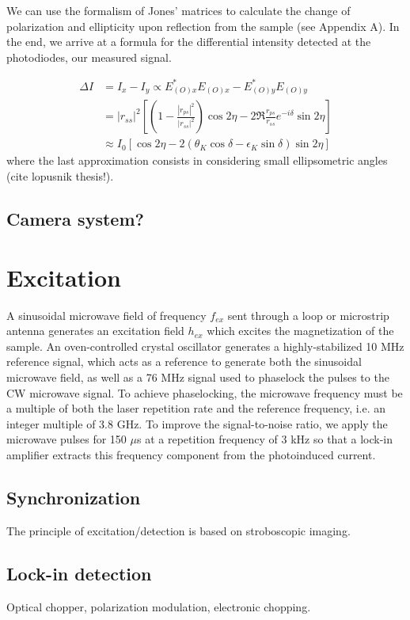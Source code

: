 \documentclass{article}
\begin{document}
We can use the formalism of Jones' matrices to calculate the change of polarization and ellipticity upon reflection from the sample (see Appendix A). In the end, we arrive at a formula for the differential intensity detected at the photodiodes, our measured signal.

\begin{align}
\Delta I &= I_{x} - I_{y} \propto E_{(O)x}^* E_{(O)x} - E_{(O)y}^* E_{(O)y} \\
&= |r_{ss}|^2 \left[ \left(1 - \frac{|r_{ps}|^2}{|r_{ss}|^2}\right) \cos{2 \eta} - 2 \Re{\frac{r_{ps}}{r_{ss}}} e^{-i \delta} \sin{2 \eta} \right] \\
&\approx I_{0} [\cos{2 \eta} - 2(\theta_{K} \cos{\delta} - \epsilon_{K} \sin{\delta}) \sin{2 \eta}]
\end{align}
where the last approximation consists in considering small ellipsometric angles (cite lopusnik thesis!).

\subsection{Camera system?}

\section{Excitation}
A sinusoidal microwave field of frequency $f_{ex}$ sent through a loop or microstrip antenna generates an excitation field $h_{ex}$ which excites the magnetization of the sample. An oven-controlled crystal oscillator generates a highly-stabilized 10 MHz reference signal, which acts as a reference to generate both the sinusoidal microwave field, as well as a 76 MHz signal used to phaselock the pulses to the CW microwave signal. To achieve phaselocking, the microwave frequency must be a multiple of both the laser repetition rate and the reference frequency, i.e. an integer multiple of 3.8 GHz. To improve the signal-to-noise ratio, we apply the microwave pulses for 150 $\mu$s at a repetition frequency of 3 kHz so that a lock-in amplifier extracts this frequency component from the photoinduced current.

\subsection{Synchronization}
The principle of excitation/detection is based on stroboscopic imaging.

\subsection{Lock-in detection}
Optical chopper, polarization modulation, electronic chopping.
\end{document}
